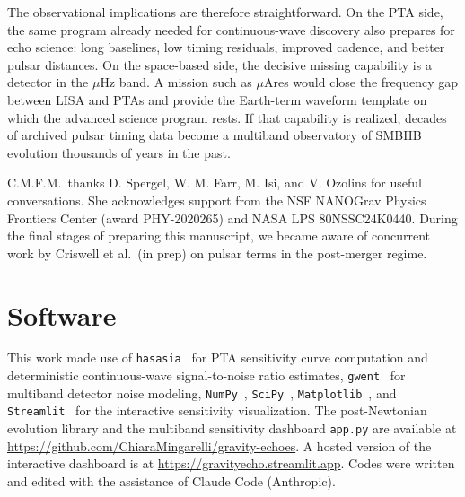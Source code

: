 \documentclass[aps,prx,twocolumn,superscriptaddress,nofootinbib,longbibliography]{revtex4-2}
\begin{document}
The observational implications are therefore straightforward. On the PTA side, the same program already needed for continuous-wave discovery also prepares for echo science: long baselines, low timing residuals, improved cadence, and better pulsar distances. On the space-based side, the decisive missing capability is a detector in the $\mu$Hz band. A mission such as $\mu$Ares would close the frequency gap between LISA and PTAs and provide the Earth-term waveform template on which the advanced science program rests. If that capability is realized, decades of archived pulsar timing data become a multiband observatory of SMBHB evolution thousands of years in the past.

\begin{acknowledgments}
C.M.F.M.\ thanks D. Spergel, W. M. Farr, M. Isi, and V. Ozolins for useful conversations. She acknowledges support from the NSF NANOGrav Physics Frontiers Center (award PHY-2020265) and NASA LPS 80NSSC24K0440. During the final stages of preparing this manuscript, we became aware of concurrent work by Criswell et al.\ (in prep) on pulsar terms in the post-merger regime.
\end{acknowledgments}

\section*{Software}

This work made use of
\texttt{hasasia}~\cite{Hazboun2019hasasia,HazbounRS2019} for PTA sensitivity curve computation and deterministic continuous-wave signal-to-noise ratio estimates,
\texttt{gwent}~\cite{Kaiser2021} for multiband detector noise modeling,
\texttt{NumPy}~\cite{numpy2020},
\texttt{SciPy}~\cite{scipy2020},
\texttt{Matplotlib}~\cite{matplotlib2007},
and \texttt{Streamlit}~\cite{streamlit} for the interactive sensitivity visualization.
The post-Newtonian evolution library and the multiband sensitivity dashboard \texttt{app.py} are available at \url{https://github.com/ChiaraMingarelli/gravity-echoes}. A hosted version of the interactive dashboard is at \url{https://gravityecho.streamlit.app}.
Codes were written and edited with the assistance of Claude Code (Anthropic).

\appendix

\end{document}
